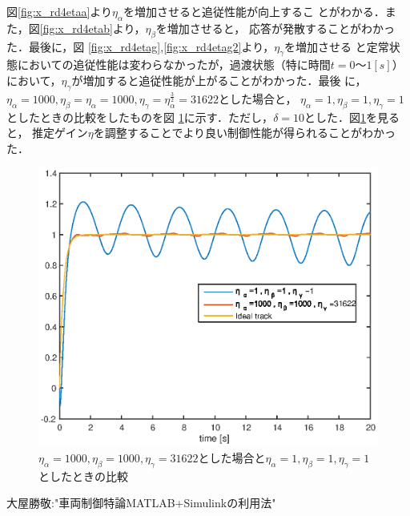 \documentclass[a4paper,12pt]{jarticle}
\begin{document}
%
図\ref{fig:x_rd4etaa}より$\eta_\alpha$を増加させると追従性能が向上するこ
とがわかる．また，図\ref{fig:x_rd4etab}より，$\eta_\beta$を増加させると，
応答が発散することがわかった．最後に，図
\ref{fig:x_rd4etag},\ref{fig:x_rd4etag2}より，$\eta_\gamma$を増加させる
と定常状態においての追従性能は変わらなかったが，過渡状態（特に時間$t=0〜1[s]$）
において，$\eta_\gamma$が増加すると追従性能が上がることがわかった．最後
に，$\eta_\alpha=1000,\eta_\beta=\eta_\alpha=1000,\eta_\gamma=\eta^\frac{3}{2}_\alpha=31622$とした場合と，
$\eta_\alpha=1,\eta_\beta=1,\eta_\gamma=1$としたときの比較をしたものを図
\ref{fig:x_rd4_eta_reform}に示す．ただし，$\delta=10$とした．図\ref{fig:x_rd4_eta_reform}を見ると，
推定ゲイン$\eta$を調整することでより良い制御性能が得られることがわかった．
%
\begin{figure}[htb]
    \begin{center}
	 \includegraphics[width=140mm]{fig/x_rd4_eta_reform.eps}
        \caption{$\eta_\alpha=1000,\eta_\beta=1000,\eta_\gamma=31622$とした場合と$\eta_\alpha=1,\eta_\beta=1,\eta_\gamma=1$としたときの比較}
        \label{fig:x_rd4_eta_reform}
    \end{center}
\end{figure}
%
%
%
%
\newpage
\begin{thebibliography}{99}

  大屋勝敬:"車両制御特論MATLAB+Simulinkの利用法"
\end{thebibliography}
\end{document}

